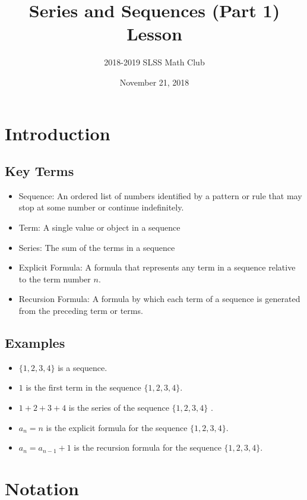 \documentclass[12pt]{article}
\title{Series and Sequences (Part 1) Lesson\vspace{-3mm}}
\author{2018-2019 SLSS Math Club\vspace{-5mm}}
\date{November 21, 2018\vspace{-5mm}}
\begin{document}
\maketitle
\section{Introduction}
\subsection{Key Terms}
\begin{itemize}
    \item Sequence: An ordered list of numbers identified by a pattern or rule that may stop at some number or continue indefinitely.
    \item Term: A single value or object in a sequence
    \item Series: The sum of the terms in a sequence
    \item Explicit Formula: A formula that represents any term in a sequence relative to the term number $n$.
    \item Recursion Formula: A formula by which each term of a sequence is generated from the preceding term or terms.
\end{itemize}

\subsection{Examples}
\begin{itemize}
    \item $\{1, 2, 3, 4\}$ is a sequence.
    \item $1$ is the first term in the sequence $\{1, 2, 3, 4\}$.
    \item $1 + 2 + 3 + 4$ is the series of the sequence $\{1, 2, 3, 4\}$ .
    \item $a_n = n$ is the explicit formula for the sequence $\{1, 2, 3, 4\}$.
    \item $a_n = a_{n-1} + 1$ is the recursion formula for the sequence $\{1, 2, 3, 4\}$.
\end{itemize}

\section{Notation}
\end{document}
